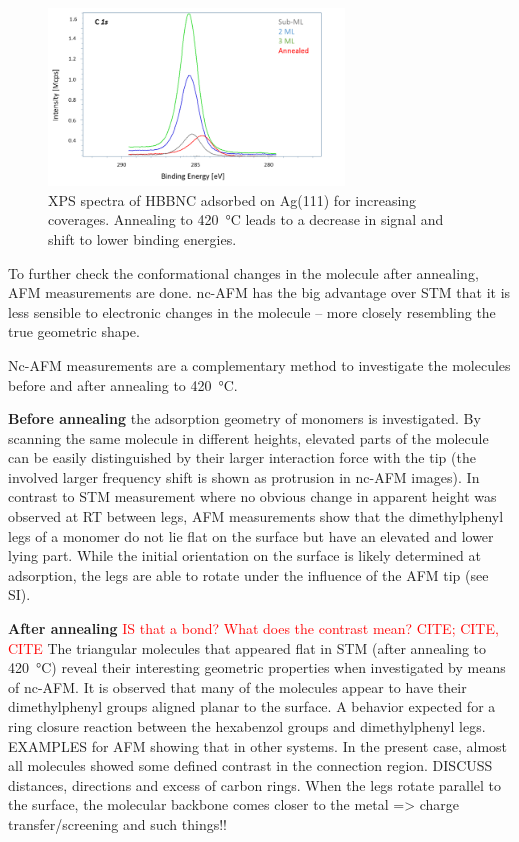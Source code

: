 \begin{figure}[] \centering
	\includegraphics[width=0.7\textwidth]{./images/hbbnc-xps1}
	\caption{XPS spectra of HBBNC adsorbed on Ag(111) for increasing coverages. Annealing to \SI{420}{\celsius} leads to a decrease in signal and shift to lower binding energies.}
	\label{}
\end{figure}

To further check the conformational changes in the molecule after annealing, AFM measurements are done. nc-AFM has the big advantage over STM that it is less sensible to electronic changes in the molecule – more closely resembling the true geometric shape.

Nc-AFM measurements are a complementary method to investigate the molecules before and after annealing to \SI{420}{\celsius}. 

\textbf{Before annealing} the adsorption geometry of monomers is investigated. By scanning the same molecule in different heights, elevated parts of the molecule can be easily distinguished by their larger interaction force with the tip (the involved larger frequency shift is shown as protrusion in nc-AFM images). In contrast to STM measurement where no obvious change in apparent height was observed at RT between legs, AFM measurements show that the dimethylphenyl legs of a monomer do not lie flat on the surface but have an elevated and lower lying part. While the initial orientation on the surface is likely determined at adsorption, the legs are able to rotate under the influence of the AFM tip (see SI).

\textbf{After annealing} \textcolor{red}{IS that a bond? What does the contrast mean? CITE; CITE, CITE}
The triangular molecules that appeared flat in STM (after annealing to \SI{420}{\celsius}) reveal their interesting geometric properties when investigated by means of nc-AFM. It is observed that many of the molecules appear to have their dimethylphenyl groups aligned planar to the surface. A behavior expected for a ring closure reaction between the hexabenzol groups and dimethylphenyl legs. EXAMPLES for AFM showing that in other systems. In the present case, almost all molecules showed some defined contrast in the connection region. DISCUSS distances, directions and excess of carbon rings.
When the legs rotate parallel to the surface, the molecular backbone comes closer to the metal => charge transfer/screening and such things!!

